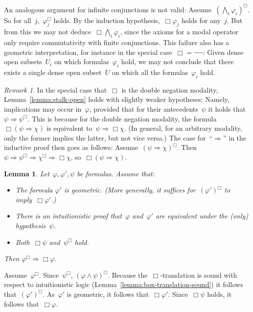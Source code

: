 \documentclass[10pt,reqno,a4paper]{amsbook}
\makeatletter
\theoremstyle{definition}
\theoremstyle{plain}
\newtheorem{lemma}[defn]{Lemma}
\theoremstyle{remark}
\newtheorem{rem}[defn]{Remark}
\newcommand{\?}{\,{:}\,}
\renewcommand{\_}{\mathpunct{.}\,}
\renewenvironment{proof}[1][\proofname]{\par
  \pushQED{\qed}%
  \normalfont \topsep6\p@\@plus6\p@\relax
  \trivlist
  \item[\hskip\labelsep
        \itshape
    #1\@addpunct{.}]\ignorespaces
}{%
  \popQED\endtrivlist\@endpefalse
}
\makeatother
\begin{document}
An analogous argument for infinite conjunctions is not valid:
Assume~$(\bigwedge_i \varphi_i)^\Box$. So for all~$j$,~$\varphi_j^\Box$ holds.
By the induction hypothesis,~$\Box\varphi_j$ holds for any~$j$. But from this
we may not deduce~$\Box\bigwedge_i \varphi_i$, since the axioms for a modal
operator only require commutativity with finite conjunctions. This failure also
has a geometric interpretation, for instance in the special case~$\Box =
\neg\neg$: Given dense open subsets~$U_i$ on which formulas~$\varphi_i$ hold,
we may not conclude that there exists a single dense open subset~$U$ on which
all the formulas~$\varphi_i$ hold.

\begin{rem}In the special case that~$\Box$ is the double negation modality,
Lemma~\ref{lemma:stalk-open} holds with slightly weaker hypotheses: Namely, implications may occur
in~$\varphi$, provided that for their antecedents~$\psi$ it holds that~$\psi
\Rightarrow \psi^\Box$. This is because for the double negation modality,
the formula~$\Box(\psi \Rightarrow \chi)$ is equivalent to~$\psi \Rightarrow
\Box\chi$. (In general, for an arbitrary modality, only the former implies the latter, but not vice versa.) The case
for~``$\Rightarrow$'' in the inductive proof then goes as follows:
Assume~$(\psi \Rightarrow \chi)^\Box$. Then~$\psi \Rightarrow \psi^\Box
\Rightarrow \chi^\Box \Rightarrow \Box\chi$, so~$\Box(\psi \Rightarrow \chi)$.
\end{rem}

\begin{lemma}\label{lemma:stalk-open-with-hypothesis}
Let~$\varphi, \varphi', \psi$ be formulas. Assume that:
\begin{itemize}
\item The formula $\varphi'$ is geometric. (More generally, it suffices for~$(\varphi')^\Box$
to imply~$\Box\varphi'$.)
\item There is an intuitionistic proof that~$\varphi$
and~$\varphi'$ are equivalent under the (only) hypothesis~$\psi$.
\item Both~$\Box\psi$ and~$\psi^\Box$ hold.
\end{itemize}
Then $\varphi^\Box \Rightarrow \Box\varphi$.
\end{lemma}
\begin{proof}
Assume~$\varphi^\Box$. Since~$\psi^\Box$, $(\varphi \wedge \psi)^\Box$. Because
the~$\Box$-translation is sound with respect to intuitionistic logic
(Lemma~\ref{lemma:box-translation-sound})
it follows that~$(\varphi')^\Box$. As~$\varphi'$ is geometric, it follows
that~$\Box\varphi'$. Since~$\Box\psi$ holds, it follows that~$\Box\varphi$.
\end{proof}
\end{document}
